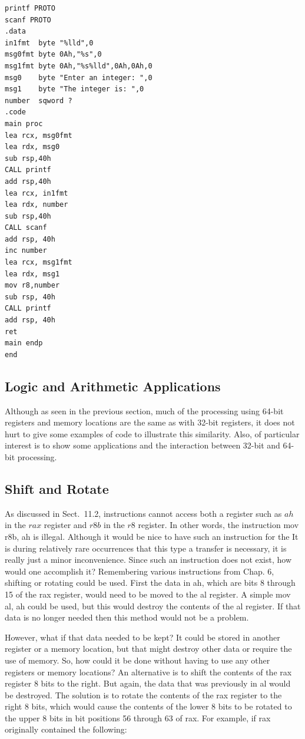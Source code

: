 \documentclass[10pt]{book}
\begin{document}
\begin{verbatim}
printf PROTO
scanf PROTO
.data
in1fmt  byte "%lld",0
msg0fmt byte 0Ah,"%s",0
msg1fmt byte 0Ah,"%s%lld",0Ah,0Ah,0
msg0    byte "Enter an integer: ",0
msg1    byte "The integer is: ",0
number  sqword ?
.code
main proc
lea rcx, msg0fmt
lea rdx, msg0
sub rsp,40h
CALL printf
add rsp,40h
lea rcx, in1fmt
lea rdx, number
sub rsp,40h
CALL scanf
add rsp, 40h
inc number
lea rcx, msg1fmt
lea rdx, msg1
mov r8,number
sub rsp, 40h
CALL printf
add rsp, 40h
ret
main endp
end
\end{verbatim}

\subsection{Logic and Arithmetic Applications}
Although as seen in the previous section, much of the processing using 64-bit registers and memory locations are the same as with 32-bit registers, it does not hurt to give some examples of code to illustrate this similarity. Also, of particular interest is to show some applications and the interaction between 32-bit and 64-bit processing.

\subsection{Shift and Rotate}
As discussed in Sect.\ 11.2, instructions cannot access both a register such as $ah$ in the $rax$ register and $r8b$ in the $r8$ register. In other words, the instruction mov r8b, ah is illegal. Although it would be nice to have such an instruction for the
It is during relatively rare occurrences that this type a transfer is necessary, it is really just a minor inconvenience. Since such an instruction does not exist, how would one accomplish it? Remembering various instructions from Chap. 6, shifting or rotating could be used. First the data in ah, which are bits 8 through 15 of the rax register, would need to be moved to the al register. A simple mov al, ah could be used, but this would destroy the contents of the al register. If that data is no longer needed then this method would not be a problem.

However, what if that data needed to be kept? It could be stored in another register or a memory location, but that might destroy other data or require the use of memory. So, how could it be done without having to use any other registers or memory locations? An alternative is to shift the contents of the rax register 8 bits to the right. But again, the data that was previously in al would be destroyed. The solution is to rotate the contents of the rax register to the right 8 bits, which would cause the contents of the lower 8 bits to be rotated to the upper 8 bits in bit positions 56 through 63 of rax. For example, if rax originally contained the following:
\end{document}
